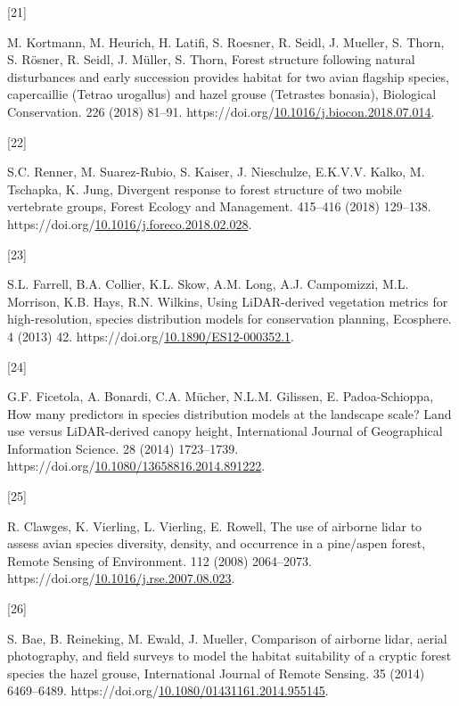 \documentclass[manuscript, 3p, authoryear]{elsarticle} %
\newlength{\cslhangindent}
\newlength{\csllabelwidth}
\newlength{\cslentryspacingunit} %
\newenvironment{CSLReferences}[2] %
 {%
  \setlength{\parindent}{0pt}
  \ifodd #1
  \let\oldpar\par
  \def\par{\hangindent=\cslhangindent\oldpar}
  \fi
  \setlength{\parskip}{#2\cslentryspacingunit}
 }%
 {}
\newcommand{\CSLLeftMargin}[1]{\parbox[t]{\csllabelwidth}{#1}}
\newcommand{\CSLRightInline}[1]{\parbox[t]{\linewidth - \csllabelwidth}{#1}\break}
\begin{document}
\begin{CSLReferences}{0}{0}
\leavevmode{}%
\CSLLeftMargin{{[}21{]} }%
\CSLRightInline{M. Kortmann, M. Heurich, H. Latifi, S. Roesner, R. Seidl, J. Mueller, S. Thorn, S. Rösner, R. Seidl, J. Müller, S. Thorn, Forest structure following natural disturbances and early succession provides habitat for two avian flagship species, capercaillie ({Tetrao} urogallus) and hazel grouse ({Tetrastes} bonasia), Biological Conservation. 226 (2018) 81--91. https://doi.org/\href{https://doi.org/10.1016/j.biocon.2018.07.014}{10.1016/j.biocon.2018.07.014}.}

\leavevmode{}%
\CSLLeftMargin{{[}22{]} }%
\CSLRightInline{S.C. Renner, M. Suarez-Rubio, S. Kaiser, J. Nieschulze, E.K.V.V. Kalko, M. Tschapka, K. Jung, Divergent response to forest structure of two mobile vertebrate groups, Forest Ecology and Management. 415--416 (2018) 129--138. https://doi.org/\href{https://doi.org/10.1016/j.foreco.2018.02.028}{10.1016/j.foreco.2018.02.028}.}

\leavevmode{}%
\CSLLeftMargin{{[}23{]} }%
\CSLRightInline{S.L. Farrell, B.A. Collier, K.L. Skow, A.M. Long, A.J. Campomizzi, M.L. Morrison, K.B. Hays, R.N. Wilkins, Using {LiDAR-derived} vegetation metrics for high-resolution, species distribution models for conservation planning, Ecosphere. 4 (2013) 42. https://doi.org/\href{https://doi.org/10.1890/ES12-000352.1}{10.1890/ES12-000352.1}.}

\leavevmode{}%
\CSLLeftMargin{{[}24{]} }%
\CSLRightInline{G.F. Ficetola, A. Bonardi, C.A. Mücher, N.L.M. Gilissen, E. Padoa-Schioppa, How many predictors in species distribution models at the landscape scale? {Land} use versus {LiDAR-derived} canopy height, International Journal of Geographical Information Science. 28 (2014) 1723--1739. https://doi.org/\href{https://doi.org/10.1080/13658816.2014.891222}{10.1080/13658816.2014.891222}.}

\leavevmode{}%
\CSLLeftMargin{{[}25{]} }%
\CSLRightInline{R. Clawges, K. Vierling, L. Vierling, E. Rowell, The use of airborne lidar to assess avian species diversity, density, and occurrence in a pine/aspen forest, Remote Sensing of Environment. 112 (2008) 2064--2073. https://doi.org/\href{https://doi.org/10.1016/j.rse.2007.08.023}{10.1016/j.rse.2007.08.023}.}

\leavevmode{}%
\CSLLeftMargin{{[}26{]} }%
\CSLRightInline{S. Bae, B. Reineking, M. Ewald, J. Mueller, Comparison of airborne lidar, aerial photography, and field surveys to model the habitat suitability of a cryptic forest species \textendash{} the hazel grouse, International Journal of Remote Sensing. 35 (2014) 6469--6489. https://doi.org/\href{https://doi.org/10.1080/01431161.2014.955145}{10.1080/01431161.2014.955145}.}


\end{CSLReferences}
\end{document}
